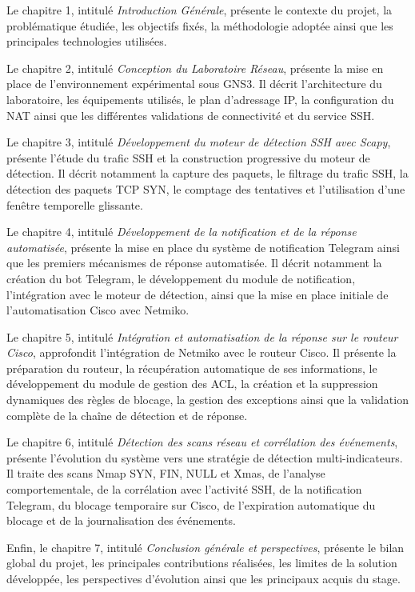 Le chapitre 1, intitulé \textit{Introduction Générale}, présente le contexte du projet, la problématique étudiée, les objectifs fixés, la méthodologie adoptée ainsi que les principales technologies utilisées.

Le chapitre 2, intitulé \textit{Conception du Laboratoire Réseau}, présente la mise en place de l'environnement expérimental sous GNS3. Il décrit l'architecture du laboratoire, les équipements utilisés, le plan d'adressage IP, la configuration du NAT ainsi que les différentes validations de connectivité et du service SSH.

Le chapitre 3, intitulé \textit{Développement du moteur de détection SSH avec Scapy}, présente l'étude du trafic SSH et la construction progressive du moteur de détection. Il décrit notamment la capture des paquets, le filtrage du trafic SSH, la détection des paquets TCP SYN, le comptage des tentatives et l'utilisation d'une fenêtre temporelle glissante.

Le chapitre 4, intitulé \textit{Développement de la notification et de la réponse automatisée}, présente la mise en place du système de notification Telegram ainsi que les premiers mécanismes de réponse automatisée. Il décrit notamment la création du bot Telegram, le développement du module de notification, l'intégration avec le moteur de détection, ainsi que la mise en place initiale de l'automatisation Cisco avec Netmiko.

Le chapitre 5, intitulé \textit{Intégration et automatisation de la réponse sur le routeur Cisco}, approfondit l'intégration de Netmiko avec le routeur Cisco. Il présente la préparation du routeur, la récupération automatique de ses informations, le développement du module de gestion des ACL, la création et la suppression dynamiques des règles de blocage, la gestion des exceptions ainsi que la validation complète de la chaîne de détection et de réponse.

Le chapitre 6, intitulé \textit{Détection des scans réseau et corrélation des événements}, présente l'évolution du système vers une stratégie de détection multi-indicateurs. Il traite des scans Nmap SYN, FIN, NULL et Xmas, de l'analyse comportementale, de la corrélation avec l'activité SSH, de la notification Telegram, du blocage temporaire sur Cisco, de l'expiration automatique du blocage et de la journalisation des événements.

Enfin, le chapitre 7, intitulé \textit{Conclusion générale et perspectives}, présente le bilan global du projet, les principales contributions réalisées, les limites de la solution développée, les perspectives d'évolution ainsi que les principaux acquis du stage.